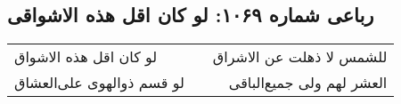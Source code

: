 \begin{center}
\section*{رباعی شماره ۱۰۶۹: لو کان اقل هذه الاشواقی}
\label{sec:1069}
\begin{longtable}{l p{0.5cm} r}
لو کان اقل هذه الاشواق
&&
للشمس لا ذهلت عن الاشراق
\\
لو قسم ذوالهوی علی‌العشاق
&&
العشر لهم ولی جمیع‌الباقی
\\
\end{longtable}
\end{center}
